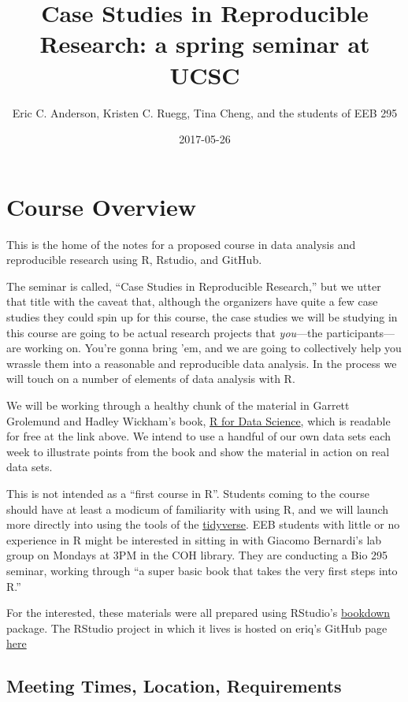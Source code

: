 \documentclass[]{book}
\title{Case Studies in Reproducible Research: a spring seminar at UCSC}
\author{Eric C. Anderson, Kristen C. Ruegg, Tina Cheng, and the students of EEB
295}
\date{2017-05-26}
\theoremstyle{definition}
\theoremstyle{definition}
\theoremstyle{remark}
\begin{document}
\maketitle

{
\setcounter{tocdepth}{1}
\tableofcontents
}
\chapter{Course Overview}\label{course-overview}

This is the home of the notes for a proposed course in data analysis and
reproducible research using R, Rstudio, and GitHub.

The seminar is called, ``Case Studies in Reproducible Research,'' but we
utter that title with the caveat that, although the organizers have
quite a few case studies they could spin up for this course, the case
studies we will be studying in this course are going to be actual
research projects that \emph{you}---the participants---are working on.
You're gonna bring 'em, and we are going to collectively help you
wrassle them into a reasonable and reproducible data analysis. In the
process we will touch on a number of elements of data analysis with R.

We will be working through a healthy chunk of the material in Garrett
Grolemund and Hadley Wickham's book, \href{http://r4ds.had.co.nz/}{R for
Data Science}, which is readable for free at the link above. We intend
to use a handful of our own data sets each week to illustrate points
from the book and show the material in action on real data sets.

This is not intended as a ``first course in R''. Students coming to the
course should have at least a modicum of familiarity with using R, and
we will launch more directly into using the tools of the
\href{http://tidyverse.org/}{tidyverse}. EEB students with little or no
experience in R might be interested in sitting in with Giacomo
Bernardi's lab group on Mondays at 3PM in the COH library. They are
conducting a Bio 295 seminar, working through ``a super basic book that
takes the very first steps into R.''

For the interested, these materials were all prepared using RStudio's
\href{https://bookdown.org/}{bookdown} package. The RStudio project in
which it lives is hosted on eriq's GitHub page
\href{https://github.com/eriqande/rep-res-eeb-2017}{here}

\section{Meeting Times, Location,
Requirements}\label{meeting-times-location-requirements}
\end{document}
